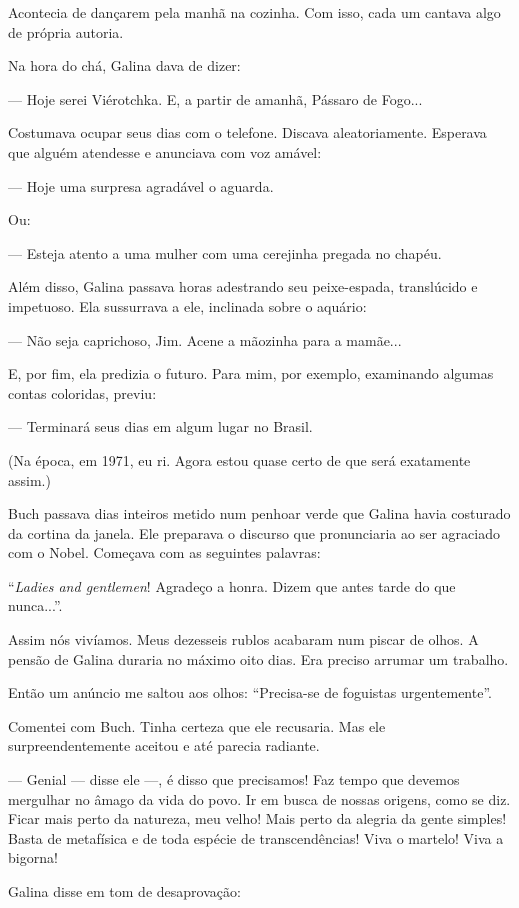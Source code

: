 Acontecia de dançarem pela manhã na cozinha. Com isso, cada um cantava
algo de própria autoria.

Na hora do chá, Galina dava de dizer:

--- Hoje serei Viérotchka. E, a partir de amanhã, Pássaro de Fogo...

Costumava ocupar seus dias com o telefone. Discava aleatoriamente.
Esperava que alguém atendesse e anunciava com voz amável:

--- Hoje uma surpresa agradável o aguarda.

Ou:

--- Esteja atento a uma mulher com uma cerejinha pregada no chapéu.

Além disso, Galina passava horas adestrando seu peixe-espada,
translúcido e impetuoso. Ela sussurrava a ele, inclinada sobre o
aquário:

--- Não seja caprichoso, Jim. Acene a mãozinha para a mamãe...

E, por fim, ela predizia o futuro. Para mim, por exemplo, examinando
algumas contas coloridas, previu:

--- Terminará seus dias em algum lugar no Brasil.

(Na época, em 1971, eu ri. Agora estou quase certo de que será
exatamente assim.)

Buch passava dias inteiros metido num penhoar verde que Galina havia
costurado da cortina da janela. Ele preparava o discurso que
pronunciaria ao ser agraciado com o Nobel. Começava com as seguintes
palavras:

``\emph{Ladies and gentlemen}! Agradeço a honra. Dizem que antes tarde
do que nunca...''.

Assim nós vivíamos. Meus dezesseis rublos acabaram num piscar de olhos.
A pensão de Galina duraria no máximo oito dias. Era preciso arrumar um
trabalho.

Então um anúncio me saltou aos olhos: ``Precisa-se de foguistas
urgentemente''.

Comentei com Buch. Tinha certeza que ele recusaria. Mas ele
surpreendentemente aceitou e até parecia radiante.

--- Genial --- disse ele ---, é disso que precisamos! Faz tempo que
devemos mergulhar no âmago da vida do povo. Ir em busca de nossas
origens, como se diz. Ficar mais perto da natureza, meu velho! Mais
perto da alegria da gente simples! Basta de metafísica e de toda espécie
de transcendências! Viva o martelo! Viva a bigorna!

Galina disse em tom de desaprovação:

